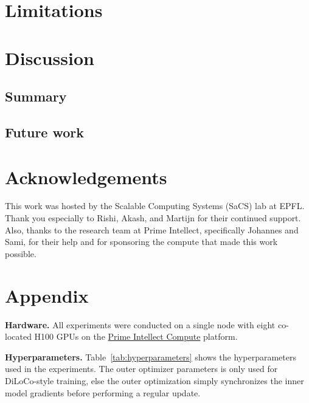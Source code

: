 \documentclass{article}
\begin{document}
\section{Limitations}



\section{Discussion}

\subsection{Summary}

\subsection{Future work}

\section*{Acknowledgements}

This work was hosted by the Scalable Computing Systems (SaCS) lab at EPFL. Thank you especially to Rishi, Akash, and Martijn for their continued support. Also, thanks to the research team at Prime Intellect, specifically Johannes and Sami, for their help and for sponsoring the compute that made this work possible.





\appendix

\section{Appendix}

\textbf{Hardware.} All experiments were conducted on a single node with eight
co-located H100 GPUs on the \href{https://app.primeintellect.com/}{Prime
Intellect Compute} platform.

\textbf{Hyperparameters.} Table~\ref{tab:hyperparameters} shows the
hyperparameters used in the experiments. The outer optimizer parameters is only
used for DiLoCo-style training, else the outer optimization simply synchronizes
the inner model gradients before performing a regular update.
\end{document}
